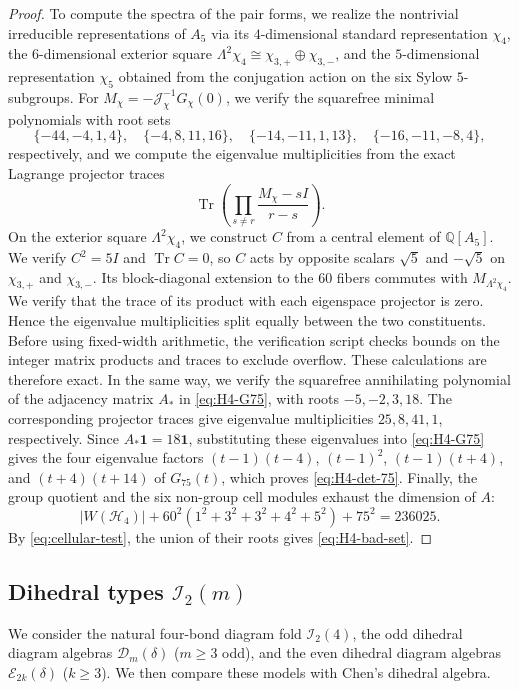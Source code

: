 \documentclass[11pt,a4paper]{amsart}
\theoremstyle{uprightdefinition}
\theoremstyle{remark}\newtheorem{remark}[theorem]{Remark}
\begin{document}
\begin{proof}
To compute the spectra of the pair forms, we realize the nontrivial irreducible representations of $A_5$
via its $4$-dimensional standard representation $\chi_4$, the
$6$-dimensional exterior square $\Lambda^2\chi_4\cong\chi_{3,+}\oplus\chi_{3,-}$, and the $5$-dimensional representation $\chi_5$ obtained
from the conjugation action on the six Sylow $5$-subgroups.
For $M_\chi=-\mathcal J_\chi^{-1}G_\chi(0)$, we verify the squarefree
minimal polynomials with root sets
\[
 \{-44,-4,1,4\},\quad\{-4,8,11,16\},\quad
 \{-14,-11,1,13\},\quad\{-16,-11,-8,4\},
\]
respectively, and we compute the eigenvalue multiplicities from the exact Lagrange projector traces
\[
 \operatorname{Tr}\left(\prod_{s\ne r}
             \frac{M_\chi-sI}{r-s}\right).
\]
On the exterior square $\Lambda^2\chi_4$, we construct $C$ from a central
element of $\mathbb Q[A_5]$. We verify $C^2=5I$ and
$\operatorname{Tr}C=0$, so $C$ acts by opposite scalars $\sqrt5$ and
$-\sqrt5$ on $\chi_{3,+}$ and $\chi_{3,-}$. Its block-diagonal extension
to the $60$ fibers commutes with $M_{\Lambda^2\chi_4}$. We verify that
the trace of its product with each eigenspace projector is zero.
Hence the eigenvalue multiplicities split equally between the two constituents.
Before using fixed-width arithmetic, the verification script checks bounds on the integer matrix products and traces to exclude overflow. These calculations are therefore exact.
In the same way, we verify the squarefree annihilating polynomial
of the adjacency matrix $A_*$ in \eqref{eq:H4-G75}, with roots
$-5,-2,3,18$. The corresponding projector traces give eigenvalue
multiplicities $25,8,41,1$, respectively. Since $A_*\mathbf1=18\mathbf1$, substituting these eigenvalues into
\eqref{eq:H4-G75} gives the four eigenvalue factors
$(t-1)(t-4)$, $(t-1)^2$, $(t-1)(t+4)$, and $(t+4)(t+14)$ of $G_{75}(t)$,
which proves \eqref{eq:H4-det-75}. Finally, the group quotient and the six
non-group cell modules exhaust the dimension of $A$:
\[
 |W(\mathscr{H}_4)|+60^2(1^2+3^2+3^2+4^2+5^2)+75^2=236025.
\]
By \eqref{eq:cellular-test}, the union of their roots gives
\eqref{eq:H4-bad-set}.
\end{proof}


\subsection{Dihedral types \texorpdfstring{$\mathscr{I}_2(m)$}{I2(m)}}
\label{subsec:type-I2}
\label{app:folded-additional}

We consider the natural four-bond diagram fold $\mathscr{I}_2(4)$, the odd dihedral diagram
algebras $\mathcal D_m(\delta)$ ($m\ge3$ odd), and the even dihedral diagram algebras
$\mathcal E_{2k}(\delta)$ ($k\ge3$). We then compare these models with Chen's
dihedral algebra.
\end{document}
